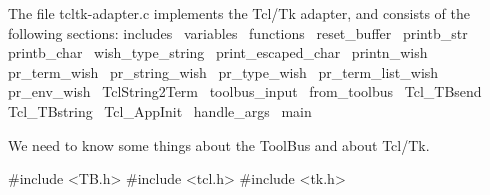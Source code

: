 

The file tcltk-adapter.c implements the Tcl/Tk adapter, and consists
of the following sections:
\endmoddef\let\nwnotused=\nwoutput{}\nwstartdeflinemarkup\nwenddeflinemarkup
\LA{}includes~{\nwtagstyle{}}\RA{}
\LA{}variables~{\nwtagstyle{}}\RA{}
\LA{}functions~{\nwtagstyle{}}\RA{}
\LA{}reset_buffer~{\nwtagstyle{}}\RA{}
\LA{}printb_str~{\nwtagstyle{}}\RA{}
\LA{}printb_char~{\nwtagstyle{}}\RA{}
\LA{}wish_type_string~{\nwtagstyle{}}\RA{}
\LA{}print_escaped_char~{\nwtagstyle{}}\RA{}
\LA{}printn_wish~{\nwtagstyle{}}\RA{}
\LA{}pr_term_wish~{\nwtagstyle{}}\RA{}
\LA{}pr_string_wish~{\nwtagstyle{}}\RA{}
\LA{}pr_type_wish~{\nwtagstyle{}}\RA{}
\LA{}pr_term_list_wish~{\nwtagstyle{}}\RA{}
\LA{}pr_env_wish~{\nwtagstyle{}}\RA{}
\LA{}TclString2Term~{\nwtagstyle{}}\RA{}
\LA{}toolbus_input~{\nwtagstyle{}}\RA{}
\LA{}from_toolbus~{\nwtagstyle{}}\RA{}
\LA{}Tcl_TBsend~{\nwtagstyle{}}\RA{}
\LA{}Tcl_TBstring~{\nwtagstyle{}}\RA{}
\LA{}Tcl_AppInit~{\nwtagstyle{}}\RA{}
\LA{}handle_args~{\nwtagstyle{}}\RA{}
\LA{}main~{\nwtagstyle{}}\RA{}
\nwnotused{tcltk-adapter.c*}\nwendcode{}\nwdocspar



We need to know some things about the ToolBus and about Tcl/Tk.

\nwenddocs{}\endmoddef\let\nwnotused=\nwoutput{}\nwstartdeflinemarkup{}\nwenddeflinemarkup
#include <TB.h>
#include <tcl.h>
#include <tk.h>
\nwendcode{}\nwdocspar

